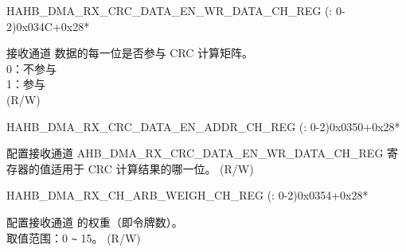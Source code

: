 \begin{register}{H}{AHB\_DMA\_RX\_CRC\_DATA\_EN\_WR\_DATA\_CH\_REG (: 0-2)}{0x034C+0x28*}\label{regdesc:AHBDMARXCRCDATAENWRDATACHNREG}
%
%
\regnewline%
\begin{regdesc}\begin{reglist}
\label{fielddesc:AHBDMARXCRCDATAENWRDATACHN}\item [AHB\_DMA\_RX\_CRC\_DATA\_EN\_WR\_DATA\_CH\regindex{n}] 接收通道  数据的每一位是否参与 CRC 计算矩阵。\\
0：不参与\\
1：参与\\ (R/W)
\end{reglist}\end{regdesc}
\end{register}


\begin{register}{H}{AHB\_DMA\_RX\_CRC\_DATA\_EN\_ADDR\_CH\_REG (: 0-2)}{0x0350+0x28*}\label{regdesc:AHBDMARXCRCDATAENADDRCHNREG}
%
\regnewline%
\begin{regdesc}\begin{reglist}
\label{fielddesc:AHBDMARXCRCDATAENADDRCHN}\item [AHB\_DMA\_RX\_CRC\_DATA\_EN\_ADDR\_CH\regindex{n}] 配置接收通道  AHB\_DMA\_RX\_CRC\_DATA\_EN\_WR\_DATA\_CH\_REG 寄存器的值适用于 CRC 计算结果的哪一位。 (R/W)
\end{reglist}\end{regdesc}
\end{register}


\begin{register}{H}{AHB\_DMA\_RX\_CH\_ARB\_WEIGH\_CH\_REG (: 0-2)}{0x0354+0x28*}\label{regdesc:AHBDMARXCHARBWEIGHCHNREG}
%
%
\regnewline%
\begin{regdesc}\begin{reglist}
\label{fielddesc:AHBDMARXCHARBWEIGHCHN}\item [AHB\_DMA\_RX\_CH\_ARB\_WEIGH\_CH\regindex{n}] 配置接收通道  的权重（即令牌数）。\\
取值范围：0 \verb+~+ 15。 (R/W)
\end{reglist}\end{regdesc}
\end{register}


